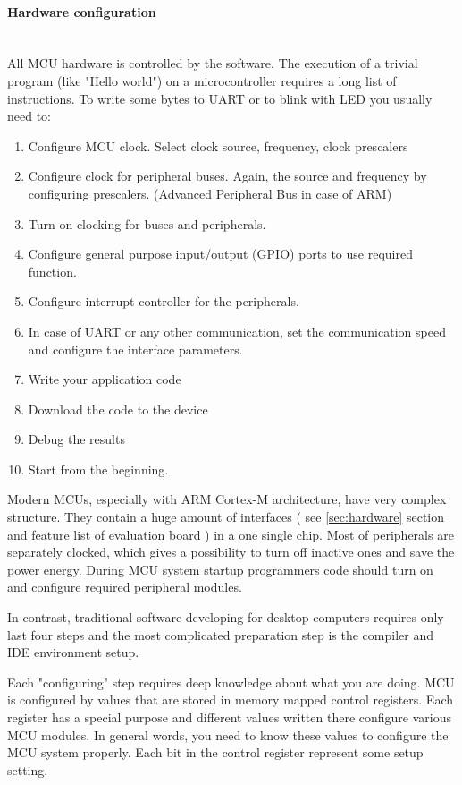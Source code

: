 \paragraph{Hardware configuration} ~\\
All MCU hardware is controlled by the software.
The execution of a trivial program (like "Hello world") on a
microcontroller requires a long list of instructions. To write some bytes to
UART or to blink with LED you usually need to:
\begin{enumerate}
  \item Configure MCU clock. Select clock source, frequency, clock prescalers
  \item Configure clock for peripheral buses. Again, the source and frequency by
  configuring prescalers. (Advanced Peripheral Bus in case of ARM)
  \item Turn on clocking for buses and peripherals.
  \item Configure general purpose input/output (GPIO) ports to use required
  function.
  \item Configure interrupt controller for the peripherals.
  \item In case of UART or any other communication, set the communication speed
  and configure the interface parameters.
  \item Write your application code
  \item Download the code to the device
  \item Debug the results
  \item Start from the beginning.
\end{enumerate}

Modern MCUs, especially with ARM Cortex-M architecture, have very complex
structure. They contain a huge amount of interfaces ( see \ref{sec:hardware}
section and feature list of evaluation board ) in a one single chip.
Most of peripherals are separately clocked, which gives a possibility to turn
off inactive ones and save the power energy. During MCU system startup
programmers code  should turn on and configure required peripheral modules.

In contrast, traditional software developing for desktop computers requires only
last four steps and the most complicated preparation step is the compiler and
IDE environment setup.

Each "configuring" step requires deep knowledge about what you are doing. MCU is
configured by values that are stored in memory mapped control registers. Each
register has a special purpose and different values written there configure
various MCU modules. In general words, you need to know these values to
configure the MCU system properly. Each bit in the control register represent
some setup setting.

